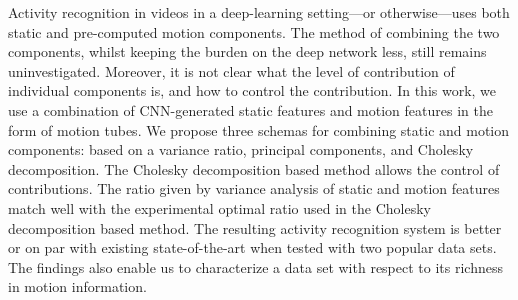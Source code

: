 Activity recognition in videos in a deep-learning setting---or otherwise---uses both static and pre-computed motion components. The method of combining the two components, whilst keeping the burden on the deep network less, still remains uninvestigated. Moreover, it is not clear what the level of contribution of individual components is, and how to control the contribution. In this work, we use a combination of CNN-generated static features and motion features in the form of motion tubes. We propose three schemas for combining static and motion components: based on a variance ratio, principal components, and Cholesky decomposition. The Cholesky decomposition based method allows the control of contributions. The ratio given by variance analysis of static and motion features match well with the experimental optimal ratio used in the Cholesky decomposition based method. The resulting activity recognition system is better or on par with existing state-of-the-art when tested with two popular data sets. The findings also enable us to characterize a data set with respect to its richness in motion information. 